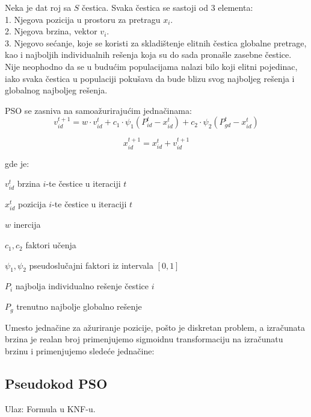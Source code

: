 \documentclass{article}
\begin{document}
Neka je dat roj sa $S$ čestica. Svaka čestica se sastoji od 3 elementa: \\

1. Njegova pozicija u prostoru za pretragu \(x_i\).\\

2. Njegova brzina, vektor \(v_i\). \\

3. Njegovo sećanje, koje se koristi za skladištenje elitnih čestica globalne pretrage, kao i najboljih individualnih rešenja koja su do sada pronašle zasebne čestice.  \\

Nije neophodno da se u budućim populacijama nalazi bilo koji elitni pojedinac, iako svaka čestica u populaciji pokušava da bude blizu svog najboljeg rešenja i globalnog najboljeg rešenja.

PSO se zasniva na samoažurirajućim jednačinama:  \\ 

$$ v_{id}^{t+1} = w\cdot v_{id}^{t} + c_1 \cdot \psi _1(P_{id}^{t} - x_{id}^{t}) + c_2\cdot \psi _2(P_{gd}^{t} - x_{id}^{t}) $$

$$ x_{id}^{t+1} = x_{id}^{t} + v_{id}^{t+1} $$
\newpage

gde je: 
\begin{list}{•}
\item $v_{id}^{t}$ brzina $i$-te čestice u iteraciji $t$ 
\item $ x_{id}^{t}$ pozicija $i$-te čestice u iteraciji $t$ 
\item $w$ inercija
\item $c_1, c_2$ faktori učenja
\item $\psi_1, \psi_2$ pseudoslučajni faktori iz intervala $[0,1]$
\item $P_i$ najbolja individualno rešenje čestice $i$
\item $P_g$ trenutno najbolje globalno rešenje 
\end{list} 
 
Umesto jednačine za ažuriranje pozicije, pošto je diskretan problem, a izračunata brzina je realan broj primenjujemo sigmoidnu transformaciju na izračunatu brzinu i primenjujemo sledeće jednačine:  \\

 
\subsection{Pseudokod PSO}
Ulaz: Formula u KNF-u. \
\end{document}
